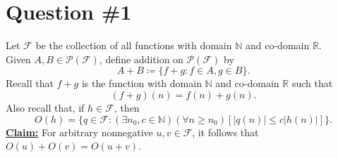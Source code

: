 \documentclass[12pt]{article}
\begin{document}
\renewcommand{\familydefault}{\rmdefault}



\pagebreak
\normalsize

\section*{Question \#1}
Let \( \mathcal{F} \) be the collection of all functions with domain \( \mathbb{N} \) and co-domain \( \mathbb{R} \). \\
Given \( A, B \in \mathcal{P}(\mathcal{F}) \), define addition on \( \mathcal{P}(\mathcal{F}) \) by
\[
    A + B \coloneq \{ f + g: f \in A, g \in B \} \text{.}
\]
Recall that \( f + g \) is the function with domain \( \mathbb{N} \) and co-domain \( \mathbb{R} \) such that
\[
    (f + g)(n) = f(n) + g(n) \text{.}
\]
Also recall that, if \( h \in \mathcal{F} \), then
\[
    O(h) = \{ q \in \mathcal{F}: (\exists n_0, c \in \mathbb{N})(\forall n \geq n_0)[|q(n)| \leq c|h(n)|] \} \text{.}
\]
\textbf{\underline{Claim:}} For arbitrary nonnegative \( u, v \in \mathcal{F} \), it follows that \( O(u) + O(v) = O(u + v) \).
\end{document}
